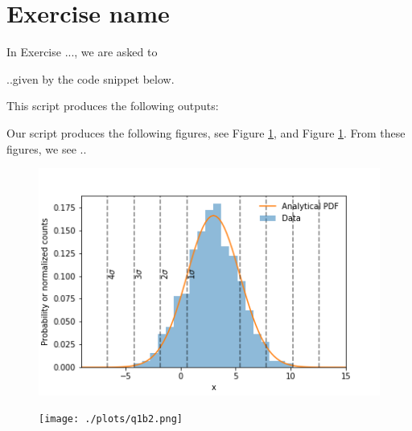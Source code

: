 \section{Exercise name}
In Exercise ..., we are asked to 

..given by the code snippet below.

% 

This script produces the following outputs:
% 

Our script produces the following figures, see Figure \ref{fig:fig}, and Figure \ref{fig:fig}. From these figures, we see ..


\begin{figure}[ht]
\centering
\begin{minipage}[t]{.5\textwidth}
  \centering
  \includegraphics[width=1.0\linewidth]{./plots/q1b1.png}
  \captionsetup{width=0.8\linewidth}
  \label{fig:fig}
\end{minipage}%
\begin{minipage}[t]{.5\textwidth}
  \centering
  \texttt{[image: ./plots/q1b2.png]}
  \captionsetup{width=0.8\linewidth}
  \label{fig:fig}
\end{minipage}
\end{figure}

